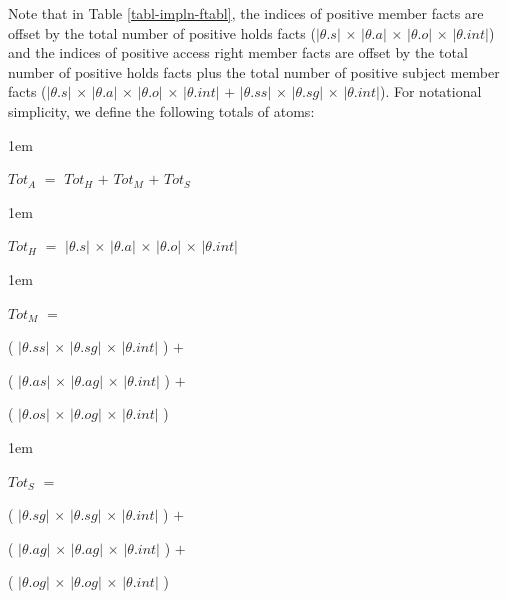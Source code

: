 \documentclass[11pt]{report}
\newenvironment{vquote}
{
  \begin{list}{}{\leftmargin 1em}\item[]
}
{
  \end{list}
}
\begin{document}
        Note that in Table \ref{tabl-impln-ftabl}, the indices of positive
        member facts are offset by the total number of positive holds
        facts ($|$$\theta$.$s$$|$ $\times$ $|$$\theta$.$a$$|$ $\times$
        $|$$\theta$.$o$$|$ $\times$ $|$$\theta$.$int$$|$) and the indices of
        positive access right member facts are offset by the total number of
        positive holds facts plus the total number of positive subject
        member facts ($|$$\theta$.$s$$|$ $\times$ $|$$\theta$.$a$$|$ $\times$
        $|$$\theta$.$o$$|$ $\times$ $|$$\theta$.$int$$|$ $+$
        $|$$\theta$.$ss$$|$ $\times$ $|$$\theta$.$sg$$|$ $\times$
        $|$$\theta$.$int$$|$). For notational simplicity, we define the
        following totals of atoms:

        \begin{vquote}
          $Tot_A$ $=$ $Tot_H$ $+$ $Tot_M$ $+$ $Tot_S$
        \end{vquote}

        \begin{vquote}
          $Tot_H$ $=$
            $|$$\theta$.$s$$|$ $\times$
            $|$$\theta$.$a$$|$ $\times$
            $|$$\theta$.$o$$|$ $\times$
            $|$$\theta$.$int$$|$
        \end{vquote}

        \begin{vquote}
          $Tot_M$ $=$

            \hspace{1em}
            (
              $|$$\theta$.$ss$$|$ $\times$
              $|$$\theta$.$sg$$|$ $\times$
              $|$$\theta$.$int$$|$
            ) $+$

            \hspace{1em}
            (
              $|$$\theta$.$as$$|$ $\times$
              $|$$\theta$.$ag$$|$ $\times$
              $|$$\theta$.$int$$|$
            ) $+$

            \hspace{1em}
            (
              $|$$\theta$.$os$$|$ $\times$
              $|$$\theta$.$og$$|$ $\times$
              $|$$\theta$.$int$$|$
            )
        \end{vquote}

        \begin{vquote}
          $Tot_S$ $=$

            \hspace{1em}
            (
              $|$$\theta$.$sg$$|$ $\times$
              $|$$\theta$.$sg$$|$ $\times$
              $|$$\theta$.$int$$|$
            ) $+$

            \hspace{1em}
            (
              $|$$\theta$.$ag$$|$ $\times$
              $|$$\theta$.$ag$$|$ $\times$
              $|$$\theta$.$int$$|$
            ) $+$

            \hspace{1em}
            (
              $|$$\theta$.$og$$|$ $\times$
              $|$$\theta$.$og$$|$ $\times$
              $|$$\theta$.$int$$|$
            )
        \end{vquote}
\end{document}
